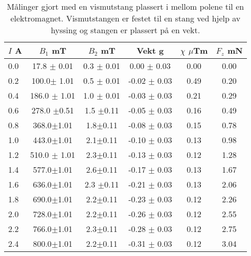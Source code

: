 \documentclass[norsk,a4paper,12pt]{article}
\begin{document}
\begin{table}[!h]
\centering
\caption[Elektromagnet, vismutstang og vekt]{Målinger gjort med en vismutstang plassert i mellom polene til en elektromagnet. Vismutstangen er festet til en stang ved hjelp av hyssing og stangen er plassert på en vekt.}
	\begin{tabular}{| l | c | c | c | c | c |}
	\hline
	$I$ A & $B_1$ mT  & $B_2$ mT & Vekt g & $\chi$ $\mu$Tm & $F_z$ mN\\ 
	\hline
	0.0 &17.8 $\pm$ 0.01&0.3 $\pm$ 0.01& 0.00 $\pm$ 0.03 & 0.00 & 0.00\\
	0.2 &100.0$\pm$ 1.01 &0.5 $\pm$ 0.01& -0.02 $\pm$ 0.03 & 0.49 & 0.20 \\
	0.4 &186.0 $\pm$ 1.01 &1.0 $\pm$ 0.01&-0.03 $\pm$ 0.03 & 0.21 & 0.29\\
	0.6 &278.0 $\pm$0.51 &1.5 $\pm$0.11 &-0.05 $\pm$ 0.03 & 0.16 & 0.49\\
	0.8 &368.0$\pm$1.01 &1.8$\pm$0.11 &-0.08 $\pm$ 0.03 & 0.15 & 0.78\\
	1.0 &443.0$\pm$1.01 &2.1$\pm$0.11 &-0.10 $\pm$ 0.03 & 0.13 & 0.98\\
	1.2 &510.0 $\pm$ 1.01 &2.3$\pm$0.11 &-0.13 $\pm$ 0.03 & 0.12 & 1.28 \\
	1.4 &577.0$\pm$1.01 &2.6$\pm$0.11 &-0.17 $\pm$ 0.03 & 0.13 & 1.67\\
	1.6 &636.0$\pm$1.01 &2.3 $\pm$0.11 &-0.21 $\pm$ 0.03 & 0.13 & 2.06\\
	1.8 &690.0$\pm$1.01 &2.2$\pm$0.11 &-0.23 $\pm$ 0.03 & 0.12 & 2.26\\
	2.0 &728.0$\pm$1.01 &2.2$\pm$0.11 &-0.26 $\pm$ 0.03 & 0.12 & 2.55\\
	2.2 &766.0$\pm$1.01 &2.3$\pm$0.11 &-0.28 $\pm$ 0.03 & 0.12 & 2.75\\
	2.4 &800.0$\pm$1.01 &2.2$\pm$0.11 &-0.31 $\pm$ 0.03 & 0.12 & 3.04\\
	\hline
	\end{tabular}\\
\label{vismuttabell}
\end{table}
\end{document}
